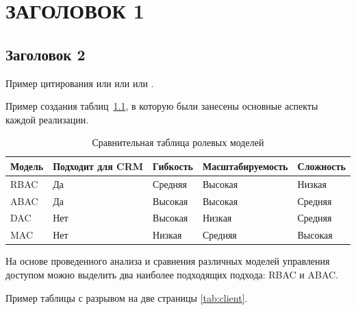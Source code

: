 \chapter{{\fontsize{14pt}{21pt}\selectfont\MakeUppercase{Заголовок 1}}}
\label{cha:analysis}

\section{Заголовок 2}


Пример цитирования \cite{law125fz1} или \cite{who2025stats} или \cite{_laravel_2023} или \cite{nestjs-docs1}.


Пример создания таблиц~\ref{tab:role}, в которую были занесены основные аспекты каждой реализации.

\begin{table}[h]
\caption{Сравнительная таблица ролевых моделей}
\label{tab:role}
\begin{tabular}{|p{2cm}|p{2.5cm}|p{2.3cm}|p{4.5cm}|p{3cm}|}
\hline
\centering Модель &  \centering Подходит для CRM & \centering Гибкость &  \centering Масштабируемость & \multicolumn{1}{c|}{Сложность} \\ \hline
RBAC   & Да                         & Средняя  & Высокая          & Низкая    \\ \hline
ABAC   & Да                         & Высокая  & Высокая          & Средняя   \\ \hline
DAC    & Нет                        & Высокая  & Низкая           & Средняя   \\ \hline
MAC    & Нет                        & Низкая   & Средняя          & Высокая   \\ \hline
\end{tabular}
\end{table}

На основе проведенного анализа и сравнения различных моделей управления доступом можно выделить два наиболее подходящих подхода: RBAC и ABAC.

Пример таблицы с разрывом на две страницы \ref{tab:client}.

